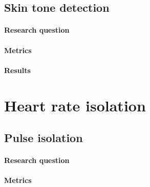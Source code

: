 \subsection{Skin tone detection}
\label{section:skin_tone_detection}
\paragraph{Research question}

\paragraph{Metrics}
\paragraph{Results}



\section{Heart rate isolation}
\subsection{Pulse isolation}
\label{section:bss}
\paragraph{Research question}
\paragraph{Metrics}
